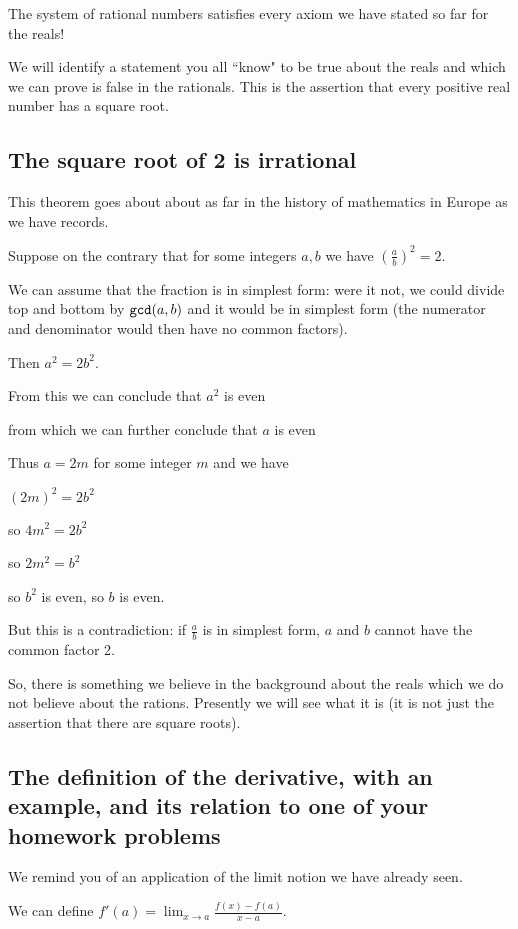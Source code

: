 \documentclass[12pt]{article}
\begin{document}
The system of rational numbers satisfies every axiom we have stated so far for the reals!

We will identify a statement you all ``know" to be true about the reals and which we can prove is false in the rationals.
This is the assertion that every positive real number has a square root.

\subsection{The square root of 2 is irrational}

This theorem goes about about as far in the history of mathematics in Europe as we have records.

Suppose on the contrary that for some integers $a,b$ we have $(\frac ab)^2 = 2$.

We can assume that the fraction is in simplest form:  were it not, we could divide top and bottom by ${\tt gcd}(a,b)$ and it would be in simplest form (the numerator and denominator would then have no common factors).

Then $a^2 = 2b^2$.

From this we can conclude that $a^2$ is even

from which we can further conclude that $a$ is even

Thus $a=2m$ for some integer $m$ and we have

$(2m)^2 = 2b^2$

so $4m^2 = 2b^2$

so $2m^2 = b^2$

so $b^2$ is even, so $b$ is even.

But this is a contradiction:  if $\frac ab$ is in simplest form, $a$ and $b$ cannot have the common factor 2.

So, there is something we believe in the background about the reals which we do not believe about the rations.  Presently we will see what it is (it is not just the assertion that there are square roots).

\subsection{The definition of the derivative, with an example, and its relation to one of your homework problems}

We remind you of an application of the limit notion we have already seen.

We can define $f'(a) = \lim_{x \rightarrow a}\frac{f(x)-f(a)}{x-a}$.
\end{document}
